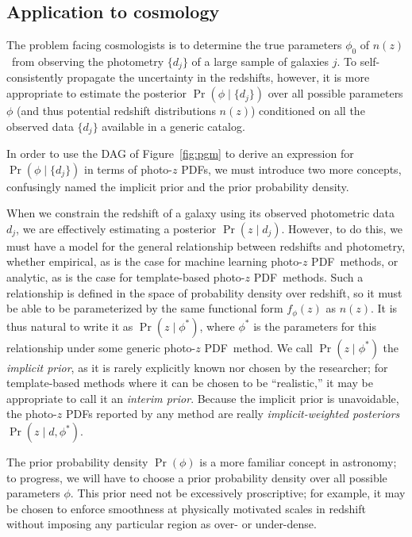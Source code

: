 \documentclass[iop]{emulateapj}
\newcommand{\nz}{$n(z)$}
\newcommand{\pzpdf}{photo-$z$ PDF}
\begin{document}
\subsection{Application to cosmology}
\label{sec:application}

The problem facing cosmologists is to determine the true parameters $\phi_{0}$ 
of \nz\ from observing the photometry $\{d_{j}\}$ of a large sample of galaxies 
$j$.
To self-consistently propagate the uncertainty in the redshifts, however, it is 
more appropriate to estimate the posterior $\Pr(\phi \mid \{d_{j}\})$ over all 
possible parameters $\phi$ (and thus potential redshift distributions \nz ) 
conditioned on all the observed data $\{d_{j}\}$ available in a generic catalog.

In order to use the DAG of Figure~\ref{fig:pgm} to derive an expression for 
$\Pr(\phi \mid \{d_{j}\})$ in terms of \pzpdf s, we must introduce two more 
concepts, confusingly named the implicit prior and the prior probability 
density.

When we constrain the redshift of a galaxy using its observed photometric data 
$d_{j}$, we are effectively estimating a posterior $\Pr(z \mid d_{j})$.
However, to do this, we must have a model for the general relationship between 
redshifts and photometry, whether empirical, as is the case for machine 
learning \pzpdf\ methods, or analytic, as is the case for template-based 
\pzpdf\ methods.
Such a relationship is defined in the space of probability density over 
redshift, so it must be able to be parameterized by the same functional form 
$f_{\phi}(z)$ as \nz .
It is thus natural to write it as $\Pr(z \mid \phi^{*})$, where $\phi^{*}$ is 
the parameters for this relationship under some generic \pzpdf\ method.
We call $\Pr(z \mid \phi^{*})$ the \textit{implicit prior}, as it is rarely 
explicitly known nor chosen by the researcher; for template-based methods where 
it can be chosen to be ``realistic,'' it may be appropriate to call it an 
\textit{interim prior}.
Because the implicit prior is unavoidable, the \pzpdf s reported by any method 
are really \textit{implicit-weighted posteriors} $\Pr(z \mid d, \phi^{*})$.

The prior probability density $\Pr(\phi)$ is a more familiar concept in 
astronomy; to progress, we will have to choose a prior probability density over 
all possible parameters $\phi$.
This prior need not be excessively proscriptive; for example, it may be chosen 
to enforce smoothness at physically motivated scales in redshift without 
imposing any particular region as over- or under-dense.
\end{document}
